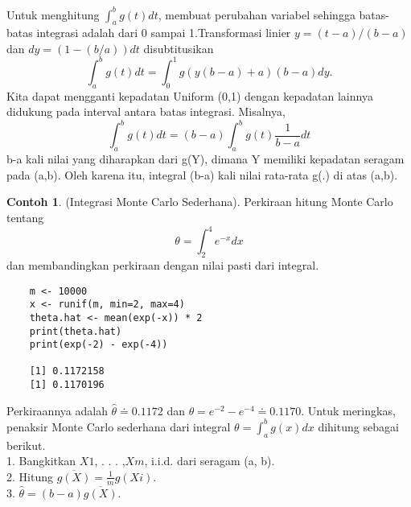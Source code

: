 \documentclass[a4paper,12pt]{article}
\theoremstyle{definition}
\newtheorem{example}{Contoh}[section]
\begin{document}
Untuk menghitung $\int_{a}^{b}g(t)dt$, membuat perubahan variabel sehingga batas-batas integrasi adalah dari 0 sampai 1.Transformasi linier $y=(t-a)/(b-a)$ dan $dy=(1-(b/a))dt$ disubtitusikan 
\begin{equation}
    \int_{a}^{b}g(t)dt= \int_{0}^{1}g(y(b-a)+a)(b-a)dy.
\end{equation}
Kita dapat mengganti kepadatan Uniform (0,1) dengan kepadatan lainnya didukung pada interval antara batas integrasi. Misalnya,
\begin{equation}
    \int_{a}^{b}g(t)dt= (b-a)\int_{a}^{b}g(t)\frac{1}{b-a}dt
\end{equation}
b-a kali nilai yang diharapkan dari g(Y), dimana Y memiliki kepadatan seragam pada (a,b). Oleh karena itu, integral (b-a) kali nilai rata-rata g(.) di atas (a,b).

\begin{example}
    (Integrasi Monte Carlo Sederhana). Perkiraan hitung Monte Carlo tentang
    \begin{equation}
        \theta= \int_{2}^{4}e^{-x}dx
    \end{equation}
    dan membandingkan perkiraan dengan nilai pasti dari integral.
\end{example}
\begin{lstlisting}
    m <- 10000
    x <- runif(m, min=2, max=4)
    theta.hat <- mean(exp(-x)) * 2
    print(theta.hat)
    print(exp(-2) - exp(-4))

    [1] 0.1172158
    [1] 0.1170196
\end{lstlisting}
Perkiraannya adalah $\hat{\theta}\doteq 0.1172$ dan $\theta= e^{-2}-e^{-4}\doteq 0.1170$.
Untuk meringkas, penaksir Monte Carlo sederhana dari integral $\theta = \int_{a}^{b}g(x)dx$ 
dihitung sebagai berikut.\\
1. Bangkitkan $X1$, . . . ,$Xm$, i.i.d. dari seragam (a, b).\\
2. Hitung $\overline{g(X)}=\frac{1}{m}g(Xi)$.\\
3. $\hat{\theta}=(b-a)\overline{g(X)}$.\\
\end{document}
